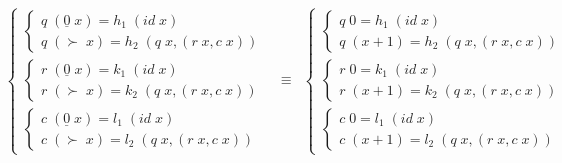 \documentclass[a4paper]{article}
\newcommand{\Varid}[1]{\mathit{#1}}
\begin{document}
\begin{eqnarray*}
\begin{cases}
    \begin{cases}
	    \ensuremath{\Varid{q}\;(\underline{\mathrm{0}}\;\Varid{x})\mathrel{=}h_1 \;(\Varid{id}\;\Varid{x})}\\
        \ensuremath{\Varid{q}\;(\succ \;\Varid{x})\mathrel{=}h_2 \;(\Varid{q}\;\Varid{x},(\Varid{r}\;\Varid{x},\Varid{c}\;\Varid{x}))} 
    \end{cases} \\
    \begin{cases}
        \ensuremath{\Varid{r}\;(\underline{\mathrm{0}}\;\Varid{x})\mathrel{=}k_1 \;(\Varid{id}\;\Varid{x})}\\ 
        \ensuremath{\Varid{r}\;(\succ \;\Varid{x})\mathrel{=}k_2 \;(\Varid{q}\;\Varid{x},(\Varid{r}\;\Varid{x},\Varid{c}\;\Varid{x}))} 
    \end{cases} \\
    \begin{cases}
        \ensuremath{\Varid{c}\;(\underline{\mathrm{0}}\;\Varid{x})\mathrel{=}l_1 \;(\Varid{id}\;\Varid{x})}\\
        \ensuremath{\Varid{c}\;(\succ \;\Varid{x})\mathrel{=}l_2 \;(\Varid{q}\;\Varid{x},(\Varid{r}\;\Varid{x},\Varid{c}\;\Varid{x}))}
    \end{cases}
\end{cases}
&
\equiv
&
\begin{cases}
    \begin{cases}
	    \ensuremath{\Varid{q}\;\mathrm{0}\mathrel{=}h_1 \;(\Varid{id}\;\Varid{x})}\\
        \ensuremath{\Varid{q}\;(\Varid{x}\mathbin{+}\mathrm{1})\mathrel{=}h_2 \;(\Varid{q}\;\Varid{x},(\Varid{r}\;\Varid{x},\Varid{c}\;\Varid{x}))} 
    \end{cases} \\
    \begin{cases}
        \ensuremath{\Varid{r}\;\mathrm{0}\mathrel{=}k_1 \;(\Varid{id}\;\Varid{x})}\\ 
        \ensuremath{\Varid{r}\;(\Varid{x}\mathbin{+}\mathrm{1})\mathrel{=}k_2 \;(\Varid{q}\;\Varid{x},(\Varid{r}\;\Varid{x},\Varid{c}\;\Varid{x}))} 
    \end{cases} \\
    \begin{cases}
        \ensuremath{\Varid{c}\;\mathrm{0}\mathrel{=}l_1 \;(\Varid{id}\;\Varid{x})}\\
        \ensuremath{\Varid{c}\;(\Varid{x}\mathbin{+}\mathrm{1})\mathrel{=}l_2 \;(\Varid{q}\;\Varid{x},(\Varid{r}\;\Varid{x},\Varid{c}\;\Varid{x}))}
    \end{cases}

\end{cases}

\end{eqnarray*}
\end{document}
